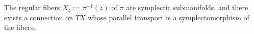 

    The regular fibers $X_z:=\pi^{-1}(z)$ of $\pi$ are symplectic submanifolds, and there exists a connection on $TX$ whose parallel transport is a symplectomorphism of the fibers. 

